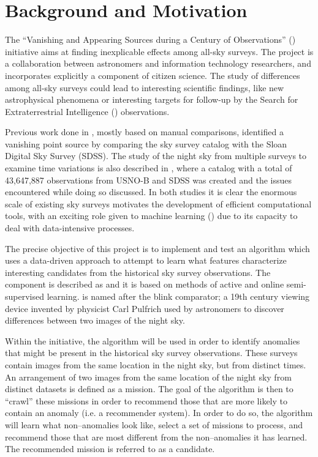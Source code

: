 \section{Background and Motivation} \label{sect:intro:background}

The ``Vanishing and Appearing Sources during a Century of Observations'' (\vasco) \cite{web:vasco} initiative aims at finding inexplicable effects among all-sky surveys. The \vasco project is a collaboration between astronomers and information technology researchers, and incorporates explicitly a component of citizen science. The study of differences among all-sky surveys could lead to interesting scientific findings, like new astrophysical phenomena or interesting targets for follow-up by the Search for Extraterrestrial Intelligence (\seti) observations. \newline

Previous work done in \cite{article:our-sky}, mostly based on manual comparisons, identified a vanishing point source by comparing the \usno sky survey catalog with the Sloan Digital Sky Survey (SDSS). The study of the night sky from multiple surveys to examine time variations is also described in \cite{article:two-epoch-catalog}, where a catalog with a total of 43,647,887 observations from USNO-B and SDSS was created and the issues encountered while doing so discussed. In both studies it is clear the enormous scale of existing sky surveys motivates the development of efficient computational tools, with an exciting role given to machine learning (\ml) due to its capacity to deal with data-intensive processes. \newline

The precise objective of this project is to implement and test an \ml algorithm which uses a data-driven approach to attempt to learn what features characterize interesting candidates from the historical sky survey observations. The \ml component is described as \mlblink and it is based on methods of active and online semi-supervised learning. \mlblink is named after the blink comparator; a 19th century viewing device invented by physicist Carl Pulfrich used by astronomers to discover differences between two images of the night sky. \newline

Within the \vasco initiative, the \mlblink algorithm will be used in order to identify anomalies that might be present in the historical sky survey observations. These surveys contain images from the same location in the night sky, but from distinct times. An arrangement of two images from the same location of the night sky from distinct datasets is defined as a mission. The goal of the \mlblink algorithm is then to ``crawl'' these missions in order to recommend those that are more likely to contain an anomaly (i.e. a recommender system). In order to do so, the \mlblink algorithm will learn what non--anomalies look like,  select a set of missions to process, and recommend those that are most different from the non--anomalies it has learned. The recommended mission is referred to as a candidate.